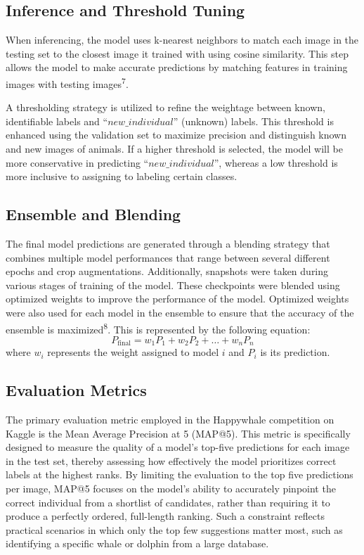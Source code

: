 \documentclass[twocolumn]{article}
\begin{document}
\subsection{Inference and Threshold Tuning}

When inferencing, the model uses k-nearest neighbors to match each image in the testing set to the closest image it trained with using cosine similarity. This step allows the model to make accurate predictions by matching features in training images with testing images\textsuperscript{7}.

A thresholding strategy is utilized to refine the weightage between known, identifiable labels and “\(new\_individual\)” (unknown) labels. This threshold is enhanced using the validation set to maximize precision and distinguish known and new images of animals. If a higher threshold is selected, the model will be more conservative in predicting “\(new\_individual\)”, whereas a low threshold is more inclusive to assigning to labeling certain classes.

\subsection{Ensemble and Blending}

The final model predictions are generated through a blending strategy that combines multiple model performances that range between several different epochs and crop augmentations. Additionally, snapshots were taken during various stages of training of the model. These checkpoints were blended using optimized weights to improve the performance of the model. Optimized weights were also used for each model in the ensemble to ensure that the accuracy of the ensemble is maximized\textsuperscript{8}. This is represented by the following equation:
\[
P_{\text{final}} = w_1 P_1 + w_2 P_2 + \dots + w_n P_n
\]
 where $w_i$ represents the weight assigned to model $i$ and $P_i$ is its prediction.

\subsection{Evaluation Metrics}

The primary evaluation metric employed in the Happywhale competition on Kaggle is the Mean Average Precision at 5 (MAP@5). This metric is specifically designed to measure the quality of a model’s top-five predictions for each image in the test set, thereby assessing how effectively the model prioritizes correct labels at the highest ranks. By limiting the evaluation to the top five predictions per image, MAP@5 focuses on the model’s ability to accurately pinpoint the correct individual from a shortlist of candidates, rather than requiring it to produce a perfectly ordered, full-length ranking. Such a constraint reflects practical scenarios in which only the top few suggestions matter most, such as identifying a specific whale or dolphin from a large database. 
\end{document}
